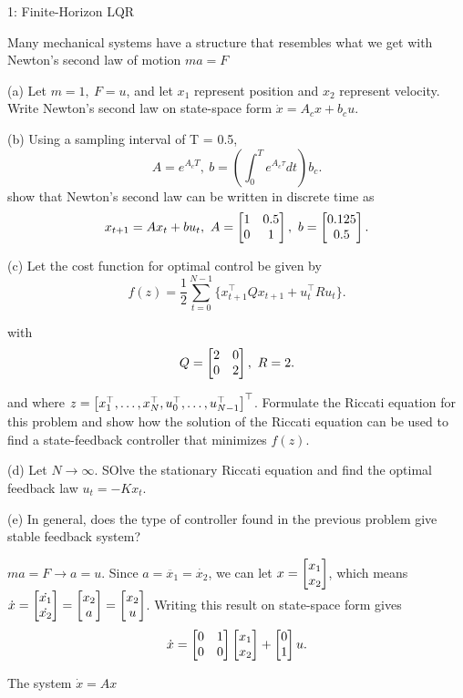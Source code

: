 
\begin{problem}{1: Finite-Horizon LQR}

Many mechanical systems have a structure that resembles what we get with Newton's second law of motion $ma = F$

\medskip (a) Let $m = 1,\ F = u$, and let $x_1$ represent position and $x_2$ represent velocity. Write Newton's 
second law on state-space form $\dot{x} = A_c x + b_c u$.

\medskip (b) Using a sampling interval of T = 0.5,
\[
  A = e^{A_c T},\  b = \left(\int_{0}^{T}e^{A_c \tau}dt\right)b_c
.\] 
show that Newton's second law can be written in discrete time as 
\[
  x_{t+1} = Ax_t + bu_t,\  A = \begin{bmatrix} 1 & 0.5 \\ 0 & 1 \end{bmatrix},\  b = \begin{bmatrix} 0.125 \\ 0.5 \end{bmatrix}
.\] 

\medskip (c) Let the cost function for optimal control be given by 
\[
  f(z) = \frac{1}{2}\sum_{t=0}^{N-1} \{x_{t+1}^{\top} Q x_{t+1} + u_t^{\top} R u_t\}
.\] 

with 
\[
  Q = \begin{bmatrix} 2 & 0 \\ 0 & 2 \end{bmatrix} ,\ R = 2
.\] 

and where $z = \begin{bmatrix} x_1^{\top},\dots,x_N^{\top},u_0^{\top},\dots,u_{N-1}^{\top} \end{bmatrix}^{\top}$. Formulate the Riccati equation for 
this problem and show how the solution of the Riccati equation can be used to find a state-feedback controller that minimizes $f(z)$. 

\medskip (d) Let $N \rightarrow \infty$. SOlve the stationary Riccati equation and find the optimal feedback law $u_t = -Kx_t$.

\medskip (e) In general, does the type of controller found in the previous problem give stable feedback system?

\end{problem}



$ma = F \rightarrow a = u$. Since $a = \ddot{x_1} = \dot{x_2}$, we can let $x = \begin{bmatrix} x_1 \\ x_2 \end{bmatrix}$, which means $\dot{x} = \begin{bmatrix} \dot{x_1} \\ \dot{x_2} \end{bmatrix} = \begin{bmatrix} x_2 \\ a \end{bmatrix} = \begin{bmatrix} x_2 \\ u \end{bmatrix}$.
Writing this result on state-space form gives
\[
  \dot{x} = \begin{bmatrix} 0 & 1 \\ 0 & 0 \end{bmatrix}\begin{bmatrix} x_1 \\ x_2 \end{bmatrix} + \begin{bmatrix} 0 \\ 1 \end{bmatrix}u
.\] 


The system $\dot{x} = Ax$ 

